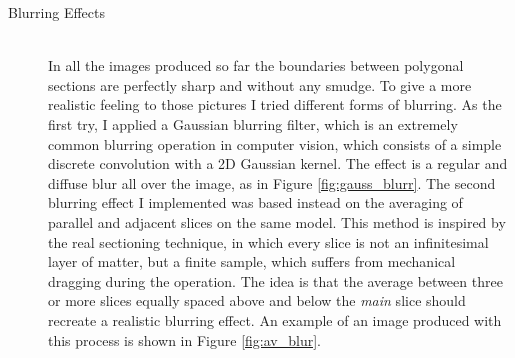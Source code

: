 \begin{description}
    \item [Blurring Effects] \hfill \\
    In all the images produced so far the boundaries between polygonal sections are perfectly sharp and without any smudge. To give a more realistic feeling to those pictures I tried different forms of blurring. As the first try, I applied a Gaussian blurring filter, which is an extremely common blurring operation in computer vision, which consists of a simple discrete convolution with a 2D Gaussian kernel. The effect is a regular and diffuse blur all over the image, as in Figure \ref{fig:gauss_blurr}. The second blurring effect I implemented was based instead on the averaging of parallel and adjacent slices on the same model. This method is inspired by the real sectioning technique, in which every slice is not an infinitesimal layer of matter, but a finite sample, which suffers from mechanical dragging during the operation. The idea is that the average between three or more slices equally spaced above and below the \textit{main} slice should recreate a realistic blurring effect. An example of an image produced with this process is shown in Figure \ref{fig:av_blur}.


\end{description}
